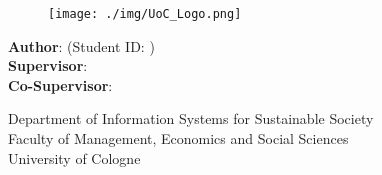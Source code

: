 \makeatletter
\begin{titlepage}
    \begin{center}
        \vspace*{1cm}

        \Large
        \textbf{\@title}

        \vspace{1.5cm}
        
        \thesistype{}
        
        \vspace{1cm}

        \begin{figure}[htbp]
             \centering
             \texttt{[image: ./img/UoC\_Logo.png]}
        \end{figure}

        \vspace{1cm}

        \large
        \textbf{Author}: \thesisauthor{} (Student ID: \studentID{})\\
        \large
        \textbf{Supervisor}: \supervisor{}\\
        \large
        \textbf{Co-Supervisor}: \cosupervisor{}

        \vspace{1cm}
        \large
        Department of Information Systems for Sustainable Society\\
        Faculty of Management, Economics and Social Sciences\\
        University of Cologne\\

        \vspace{1cm}
        \@date

    \end{center}
\end{titlepage}
\makeatother